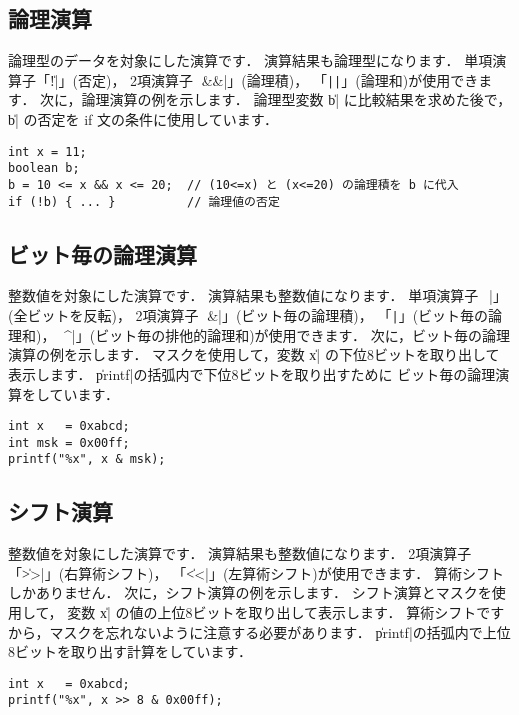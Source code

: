 \subsection{論理演算}

論理型のデータを対象にした演算です．
演算結果も論理型になります．
単項演算子「\|!|」(否定)，
2項演算子
「\|&&|」(論理積)，
「\verb/||/」(論理和)が使用できます．
次に，論理演算の例を示します．
論理型変数 \|b| に比較結果を求めた後で，
\|b| の否定を if 文の条件に使用しています．

\begin{mylist}
\begin{verbatim}
int x = 11;
boolean b;
b = 10 <= x && x <= 20;  // (10<=x) と (x<=20) の論理積を b に代入
if (!b) { ... }          // 論理値の否定
\end{verbatim}
\end{mylist}

\subsection{ビット毎の論理演算}

整数値を対象にした演算です．
演算結果も整数値になります．
単項演算子「\|~|」(全ビットを反転)，
2項演算子
「\|&|」(ビット毎の論理積)，
「\verb/|/」(ビット毎の論理和)，
「\|^|」(ビット毎の排他的論理和)が使用できます．
次に，ビット毎の論理演算の例を示します．
マスクを使用して，変数 \|x| の下位8ビットを取り出して表示します．
\|printf|の括弧内で下位8ビットを取り出すために
ビット毎の論理演算をしています．

\begin{mylist}
\begin{verbatim}
int x   = 0xabcd;
int msk = 0x00ff;
printf("%x", x & msk);
\end{verbatim}
\end{mylist}

\subsection{シフト演算}

整数値を対象にした演算です．
演算結果も整数値になります．
2項演算子
「\|>>|」(右算術シフト)，
「\|<<|」(左算術シフト)が使用できます．
算術シフトしかありません．
次に，シフト演算の例を示します．
シフト演算とマスクを使用して，
変数 \|x| の値の上位8ビットを取り出して表示します．
算術シフトですから，マスクを忘れないように注意する必要があります．
\|printf|の括弧内で上位8ビットを取り出す計算をしています．

\begin{mylist}
\begin{verbatim}
int x   = 0xabcd;
printf("%x", x >> 8 & 0x00ff);
\end{verbatim}
\end{mylist}

